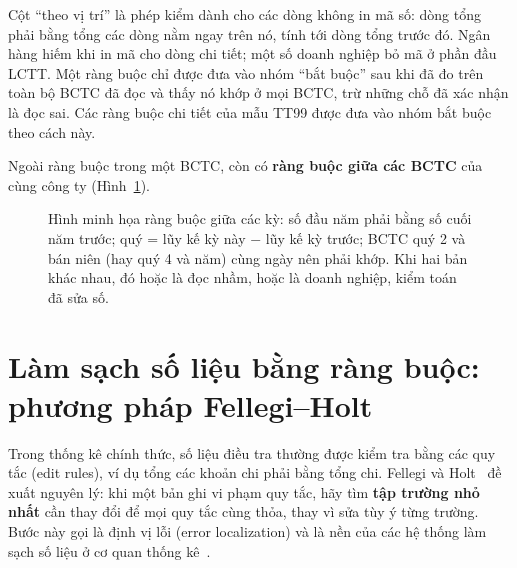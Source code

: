 \documentclass[12pt,a4paper]{report}
\newcommand{\enquote}[1]{“#1”}
\begin{document}
Cột \enquote{theo vị trí} là phép kiểm dành cho các dòng không in mã số: dòng tổng phải bằng tổng các dòng nằm ngay
trên nó, tính tới dòng tổng trước đó. Ngân hàng hiếm khi in mã cho dòng chi tiết; một số doanh nghiệp bỏ mã ở phần đầu
LCTT. Một ràng buộc chỉ được đưa vào nhóm \enquote{bắt buộc} sau khi đã đo trên toàn bộ BCTC đã đọc và thấy nó khớp ở
mọi BCTC, trừ những chỗ đã xác nhận là đọc sai. Các ràng buộc chi tiết của mẫu TT99 được đưa vào nhóm bắt buộc theo
cách này.

Ngoài ràng buộc trong một BCTC, còn có \textbf{ràng buộc giữa các BCTC} của cùng công ty (Hình~\ref{fig:cheoky}).

\begin{figure}[H]
\centering
{}
\caption{Hình minh họa ràng buộc giữa các kỳ: số đầu năm phải bằng số cuối năm trước; quý = lũy kế kỳ này $-$ lũy kế kỳ trước; BCTC
quý 2 và bán niên (hay quý 4 và năm) cùng ngày nên phải khớp. Khi hai bản khác nhau, đó hoặc là đọc nhầm, hoặc là
doanh nghiệp, kiểm toán đã sửa số.}\label{fig:cheoky}
\end{figure}

\section{Làm sạch số liệu bằng ràng buộc: phương pháp Fellegi--Holt}
Trong thống kê chính thức, số liệu điều tra thường được kiểm tra bằng các quy tắc (edit rules), ví dụ tổng các khoản chi
phải bằng tổng chi. Fellegi và Holt~\cite{fellegi1976} đề xuất nguyên lý: khi một bản ghi vi phạm quy tắc, hãy tìm
\textbf{tập trường nhỏ nhất} cần thay đổi để mọi quy tắc cùng thỏa, thay vì sửa tùy ý từng trường. Bước này gọi là định
vị lỗi (error localization) và là nền của các hệ thống làm sạch số liệu ở cơ quan thống kê~\cite{dewaal2011}.
\end{document}
